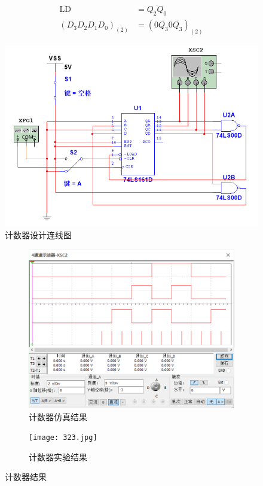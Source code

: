 \documentclass{ctexrep}
\begin{document}
\begin{align}
	\overline{\mathrm{LD}} &= \overline{Q_2Q_0}\\
	(D_3D_2D_1D_0)_{(2)} &= (0 \overline{Q_3}0 \overline{Q_3} )_{(2)}
\end{align}

\begin{figure}[htpb]
	\centering
	\includegraphics[width=0.8\linewidth]{321.png}
	\caption{计数器设计连线图}
	\label{fig:计数器设计连线图}
\end{figure}

\begin{figure}[htpb]
	\centering
	\begin{subfigure}[htpb]{.45\linewidth}
		\centering
		\includegraphics[width=\linewidth]{322.png}
		\caption{计数器仿真结果}
		\label{fig:计数器仿真结果}
	\end{subfigure}
	\quad
	\begin{subfigure}[htpb]{.45\linewidth}
		\centering
		\texttt{[image: 323.jpg]}
		\caption{计数器实验结果}
		\label{fig:计数器实验结果}
	\end{subfigure}
	\caption{计数器结果}
	\label{fig:计数器结果}
\end{figure}
\end{document}
